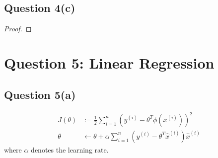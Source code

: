 \documentclass[11pt]{article}
\newcommand{\upi}[0]{^{(i)}}
\begin{document}
	\newpage
	\subsection{Question 4(c)}
	\begin{proof}
		
	\end{proof}
	
	\newpage
	\section{Question 5: Linear Regression}
	\subsection{Question 5(a)}
	\begin{align}
		J(\theta) &:= \frac{1}{2} \sum_{i=1}^n \left(y\upi - \theta^T \phi(x\upi) \right)^2 \\
		\theta &\leftarrow \theta + \alpha \sum_{i=1}^n \left(y\upi - \theta^T \hat{x}\upi \right) \hat{x}\upi
	\end{align}
	where $\alpha$ denotes the learning rate.
\end{document}
